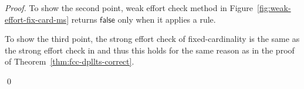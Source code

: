 \documentclass{svjour3}                     %
\begin{document}
\begin{proof}
To show the second point, weak effort check method in Figure~\ref{fig:weak-effort-fix-card-ms} 
returns $\mathsf{false}$ only when it applies a rule.

To show the third point,
the strong effort check of fixed-cardinality \checkfcc is the same as the strong effort check in \checkfcc
and thus this holds for the same reason as in the proof of Theorem~\ref{thm:fcc-dpllts-correct}.
\begin{comment}
In the case that $F$ is unsatisfiable,
for each $1 \leq i \leq n$, let $k_i$ be smallest integer greater than or equal to the number of terms of sort $\So_i$ in $F$,
and such that the literal $\neg \card[\So_i,k_i]$ does not occur in $F$.
Let $k$ be the smallest integer greater than or equal to $k_1 + \ldots + k_n$,
and such that the literal $\neg \card[\Sigma,k]$ does not occur in $F$.
Assume that there exists an infinite execution $e$ of fixed-cardinality \checkfcc. 
As a consequence of Lemma~\ref{lem:fixed-card-dpllts} for cardinalities $n, \ldots, k$,
we can conclude there is a prefix of $e$ ending in $\state{M \neg \card[\Sigma,k], F',\none}$.
For this to be the case, either $\neg \card[\Sigma, k]$ was added to the assignment due to propagation or due to \backjump.
In either case, we have that $\neg \card[\Sigma,k]$ either must exist as a literal in some clause in $F'$,
or must be implied by a set of literals from our assignment.
Due to our selection of $k$, this is a contradiction.
Thus, when $F$ is unsatisfiable, every execution of fixed-cardinality \checkfcc for $F$ terminates.

In the case that $F$ is satisfiable, since it is ground, 
due to Proposition~\ref{prop:fcc-finite},
it must have a model with domain size $k_i$ for $\So_i$ for some finite integer $k_i > 0$, for each $1 \leq i \leq n$.
Let $k = k_1 + \ldots + k_n$.
It can be shown that the set of literals $L_\fcc$ introduced by applications of \learn{i} in this procedure
consists (at most) of the set of all equalities and disequalities between terms from $F$,
literals of the form $(\neg) \card[\Sigma,j]$ for $j = n, \ldots, k$,
as well as all literals of the form $(\neg) \card[\So_i,j]$ for $j \lt (k-n)$, for each sort $\So_i$.
Since this set is finite, by the same argument as Theorem~\ref{thm:dpllts-correct}, the procedure terminates,
and thus for the same argument as in Theorem~\ref{thm:fcc-dpllts-correct}, it is also complete.
\end{comment}
%
\qed
\end{proof}
\end{document}
